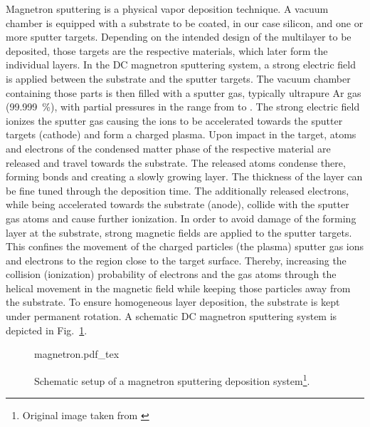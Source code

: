 Magnetron sputtering is a physical vapor deposition technique. A vacuum chamber is equipped with a substrate to be coated, in our case silicon, and one or more sputter targets. Depending on the intended design of the multilayer to be deposited, those targets are the respective materials, which later form the individual layers. In the DC magnetron sputtering system, a strong electric field is applied between the substrate and the sputter targets. The vacuum chamber containing those parts is then filled with a sputter gas, typically ultrapure Ar gas (\SI{99.999}{\percent}), with partial pressures in the range from  to  \cite{stearns_fabrication_1991}. The strong electric field ionizes the sputter gas causing the ions to be accelerated towards the sputter targets (cathode) and form a charged plasma. Upon impact in the target, atoms and electrons of the condensed matter phase of the respective material are released and travel towards the substrate. The released atoms condense there, forming bonds and creating a slowly growing layer. The thickness of the layer can be fine tuned through the deposition time. The additionally released electrons, while being accelerated towards the substrate (anode), collide with the sputter gas atoms and cause further ionization. In order to avoid damage of the forming layer at the substrate, strong magnetic fields are applied to the sputter targets. This confines the movement of the charged particles (the plasma) sputter gas ions and electrons to the region close to the target surface. Thereby, increasing the collision (ionization) probability of electrons and the gas atoms through the helical movement in the magnetic field while keeping those particles away from the substrate. To ensure homogeneous layer deposition, the substrate is kept under permanent rotation. A schematic DC magnetron sputtering system is depicted in Fig.~\ref{ch_exp:magnetron_sputtering_schematic}.
\begin{figure}[htb]
        \def\svgwidth{0.65\textwidth}
	{magnetron.pdf_tex}
        \caption[Schematic setup of a magnetron sputtering deposition system.]{%
            Schematic setup of a magnetron sputtering deposition system\footnote{Original image taken from \textcite{stearns_fabrication_1991}}.}
        \label{ch_exp:magnetron_sputtering_schematic}
\end{figure}


